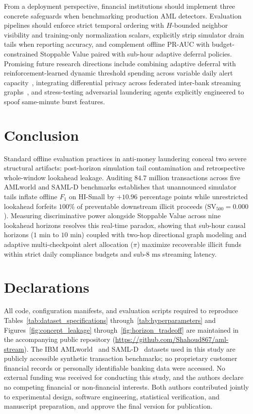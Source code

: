 \documentclass[pdflatex,sn-mathphys,Numbered]{sn-jnl}
\theoremstyle{thmstyleone}
\begin{document}
From a deployment perspective, financial institutions should implement three concrete safeguards when benchmarking production AML detectors. Evaluation pipelines should enforce strict temporal ordering with $H$-bounded neighbor visibility and training-only normalization scalars, explicitly strip simulator drain tails when reporting accuracy, and complement offline PR-AUC with budget-constrained Stoppable Value paired with sub-hour adaptive deferral policies. Promising future research directions include combining adaptive deferral with reinforcement-learned dynamic threshold spending across variable daily alert capacity~\cite{shen2020dqn}, integrating differential privacy across federated inter-bank streaming graphs~\cite{han2026fgegcn}, and stress-testing adversarial laundering agents explicitly engineered to spoof same-minute burst features.

\section{Conclusion}\label{sec:conclusion}

Standard offline evaluation practices in anti-money laundering conceal two severe structural artifacts: post-horizon simulation tail contamination and retrospective whole-window lookahead leakage. Auditing $84.7\text{ million}$ transactions across five AMLworld and SAML-D benchmarks establishes that unannounced simulator tails inflate offline $F_1$ on HI-Small by $+10.96$ percentage points while unrestricted lookahead forfeits $100\%$ of preventable downstream illicit proceeds ($\text{SV}_{500} = 0.000$). Measuring discriminative power alongside Stoppable Value across nine lookahead horizons resolves this real-time paradox, showing that sub-hour causal horizons ($1\text{ min}$ to $10\text{ min}$) coupled with two-hop directional graph modeling and adaptive multi-checkpoint alert allocation ($\pi$) maximize recoverable illicit funds within strict daily compliance budgets and sub-$8\text{ ms}$ streaming latency.

\section*{Declarations}

All code, configuration manifests, and evaluation scripts required to reproduce Tables~\ref{tab:dataset_specifications} through~\ref{tab:hyperparameters} and Figures~\ref{fig:concept_leakage} through~\ref{fig:horizon_tradeoff} are maintained in the accompanying public repository (\url{https://github.com/Shahoud867/aml-stream}). The IBM AMLworld~\cite{altman2023ibmaml} and SAML-D~\cite{oztas2023samld} datasets used in this study are publicly accessible synthetic transaction benchmarks; no proprietary customer financial records or personally identifiable banking data were accessed. No external funding was received for conducting this study, and the authors declare no competing financial or non-financial interests. Both authors contributed jointly to experimental design, software engineering, statistical verification, and manuscript preparation, and approve the final version for publication.
\end{document}
